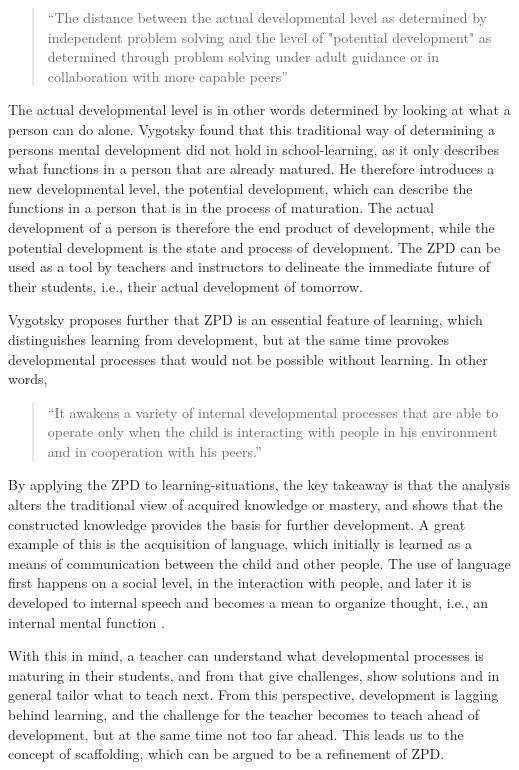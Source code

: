 \begin{quote}“The distance between the actual developmental level as determined by independent problem solving and the level of "potential development" as determined through problem solving under adult guidance or in collaboration with more capable peers” \citep[p. 86]{vygotskiui1978mind}
\end{quote}

The actual developmental level is in other words determined by looking at what a person can do alone. Vygotsky found that this traditional way of determining a persons mental development did not hold in school-learning, as it only describes what functions in a person that are already matured. He therefore introduces a new developmental level, the potential development, which can describe the functions in a person that is in the process of maturation. The actual development of a person is therefore the end product of development, while the potential development is the state and process of development. The ZPD can be used as a tool by teachers and instructors to delineate the immediate future of their students, i.e., their actual development of tomorrow.

Vygotsky proposes further that ZPD is an essential feature of learning, which distinguishes learning from development, but at the same time provokes developmental processes that would not be possible without learning. In other words,

\begin{quote}“It awakens a variety of internal developmental processes that are able to operate only when the child is interacting with people  in  his  environment  and  in  cooperation  with his peers.” \citep[p. 90]{vygotskiui1978mind}
\end{quote}

By applying the ZPD to learning-situations, the key takeaway is that the analysis alters the traditional view of acquired knowledge or mastery, and shows that the constructed knowledge provides the basis for further development. A great example of this is the acquisition of language, which initially is learned as a means of communication between the child and other people. The use of language first happens on a social level, in the interaction with people, and later it is developed to internal speech and becomes a mean to organize thought, i.e., an internal mental function \citep[p. 89]{vygotskiui1978mind}.

With this in mind, a teacher can understand what developmental processes is maturing in their students, and from that give challenges, show solutions and in general tailor what to teach next. From this perspective, development is lagging behind learning, and the challenge for the teacher becomes to teach ahead of development, but at the same time not too far ahead. This leads us to the concept of scaffolding, which can be argued to be a refinement of ZPD.

